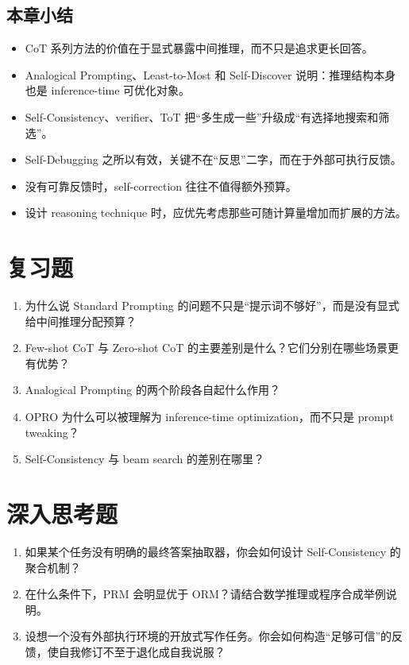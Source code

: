 \subsection{本章小结}

\begin{itemize}
\item CoT 系列方法的价值在于显式暴露中间推理，而不只是追求更长回答。
\item Analogical Prompting、Least-to-Most 和 Self-Discover 说明：推理结构本身也是 inference-time 可优化对象。
\item Self-Consistency、verifier、ToT 把“多生成一些”升级成“有选择地搜索和筛选”。
\item Self-Debugging 之所以有效，关键不在“反思”二字，而在于外部可执行反馈。
\item 没有可靠反馈时，self-correction 往往不值得额外预算。
\item 设计 reasoning technique 时，应优先考虑那些可随计算量增加而扩展的方法。
\end{itemize}

\section{复习题}

\begin{enumerate}
\item 为什么说 Standard Prompting 的问题不只是“提示词不够好”，而是没有显式给中间推理分配预算？
\item Few-shot CoT 与 Zero-shot CoT 的主要差别是什么？它们分别在哪些场景更有优势？
\item Analogical Prompting 的两个阶段各自起什么作用？
\item OPRO 为什么可以被理解为 inference-time optimization，而不只是 prompt tweaking？
\item Self-Consistency 与 beam search 的差别在哪里？
\end{enumerate}

\section{深入思考题}

\begin{enumerate}
\item 如果某个任务没有明确的最终答案抽取器，你会如何设计 Self-Consistency 的聚合机制？
\item 在什么条件下，PRM 会明显优于 ORM？请结合数学推理或程序合成举例说明。
\item 设想一个没有外部执行环境的开放式写作任务。你会如何构造“足够可信”的反馈，使自我修订不至于退化成自我说服？
\end{enumerate}

